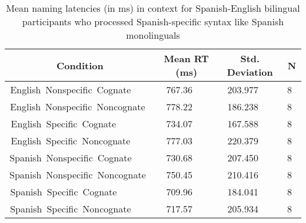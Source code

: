 \begin{table}[hptb]
\begin{center}
\begin{tabular}{|c|c|c|c|} \hline
\multicolumn{1}{|c|}{Condition}&\multicolumn{1}{c|}{Mean RT (ms)}&\multicolumn{1}{c|}{Std. Deviation}&\multicolumn{1}{c|}{N}\\ \hline\hline
English~Nonspecific~Cognate~~~~&767.36~~~&203.977~~~&8~\\ 
English~Nonspecific~Noncognate~&778.22~~~&186.238~~~&8~\\ 
\hline
English~Specific~Cognate~~~~~~~&734.07~~~&167.588~~~&8~\\ 
English~Specific~Noncognate~~~~&777.03~~~&220.379~~~&8~\\ 
\hline\hline
Spanish~Nonspecific~Cognate~~~~&730.68~~~&207.450~~~&8~\\ 
Spanish~Nonspecific~Noncognate~&750.45~~~&210.416~~~&8~\\ 
\hline
Spanish~Specific~Cognate~~~~~~~&709.96~~~&184.041~~~&8~\\ 
Spanish~Specific~Noncognate~~~~&717.57~~~&205.934~~~&8~\\ 
\hline
\end{tabular}
\caption{Mean naming latencies (in ms) in context for Spanish-English bilingual participants who processed Spanish-specific syntax like Spanish monolinguals}\label{spec_faster_means}
\end{center}
\end{table}
